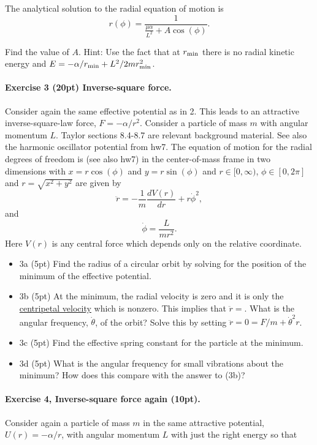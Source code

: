 \documentclass[%
oneside,                 %
final,                   %
10pt]{article}
\begin{document}
The analytical solution to the radial equation of motion is
\[
r(\phi) = \frac{1}{\frac{\mu\alpha}{L^2}+A\cos{(\phi)}}.
\]

Find the value of $A$. Hint: Use the fact that at $r_{\rm min}$
there is no radial kinetic energy and $E=-\alpha/r_{\rm min}+L^2/2mr_{\rm min}^2$.


\paragraph{Exercise 3 (20pt) Inverse-square force.}
Consider again the same effective potential as in 2. This leads to an attractive inverse-square-law force, $F=-\alpha/r^2$. Consider a particle of mass $m$ with angular momentum $L$. Taylor sections 8.4-8.7 are relevant background material.  See also the harmonic oscillator potential from hw7. The equation of motion for the radial degrees of freedom is (see also hw7) in the center-of-mass frame in two dimensions with $x=r\cos{(\phi)}$ and $y=r\sin{(\phi)}$ and
$r\in [0,\infty)$, $\phi\in [0,2\pi]$ and $r=\sqrt{x^2+y^2}$ are given by
\[
\ddot{r}=-\frac{1}{m}\frac{dV(r)}{dr}+r\dot{\phi}^2,
\]
and
\[
\dot{\phi}=\frac{L}{m r^2}.
\]
Here $V(r)$ is any central force which depends only on the relative coordinate.


\begin{itemize}
\item 3a (5pt)  Find the radius of a circular orbit by solving for the position of the minimum of the effective potential. 

\item 3b (5pt) At the minimum, the radial velocity is zero and it is only the \href{{https://en.wikipedia.org/wiki/Centripetal_force}}{centripetal velocity} which is nonzero. This implies that $\ddot{r}=$.  What is the angular frequency, $\dot{\theta}$, of the orbit? Solve this by setting $\ddot{r}=0=F/m+\dot{\theta}^2r$.

\item 3c (5pt) Find the effective spring constant for the particle at the minimum.

\item 3d (5pt) What is the angular frequency for small vibrations about the minimum? How does this compare with the answer to (3b)?
\end{itemize}

\noindent
\paragraph{Exercise 4, Inverse-square force again (10pt).}
Consider again a  particle of mass $m$ in the same attractive potential, $U(r)=-\alpha/r$, with angular momentum $L$ with just the right energy so that
\end{document}
